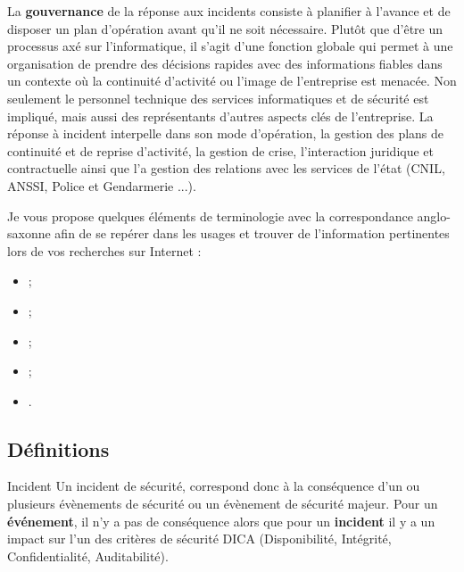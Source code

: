 La \textbf{gouvernance} de la réponse aux incidents consiste à planifier à l'avance et  de disposer un plan d'opération avant qu'il ne soit nécessaire. Plutôt que d'être un processus axé sur l'informatique, il s'agit d'une fonction  globale qui permet à une organisation de prendre des décisions rapides avec des informations fiables dans un contexte où la continuité d'activité ou l'image de l'entreprise est menacée. Non seulement le personnel technique des services informatiques et de sécurité est impliqué, mais aussi des représentants d'autres aspects clés de l'entreprise. La réponse à incident  interpelle  dans son mode d'opération, la gestion des plans de continuité et de reprise d'activité, la gestion de crise,  l'interaction juridique et contractuelle  ainsi que l'a gestion des relations avec les services de l'état (CNIL, ANSSI, Police et Gendarmerie ...). 

Je vous propose quelques éléments de terminologie avec la correspondance anglo-saxonne afin de se repérer dans les usages et trouver de l'information pertinentes lors de vos recherches sur Internet :

\begin{itemize}
		\item {};
		\item{};
		\item {};
		\item {};
		\item {}.
\end{itemize}

\subsection{Définitions}

\begin{notebox}{Incident}
Un incident de sécurité, correspond donc à la conséquence d’un ou plusieurs évènements de sécurité ou un évènement de sécurité majeur. Pour un \textbf{événement}, il n'y a pas de conséquence alors que pour un \textbf{incident} il y a un impact sur l’un des critères de sécurité DICA (Disponibilité, Intégrité, Confidentialité, Auditabilité).
\end{notebox}

